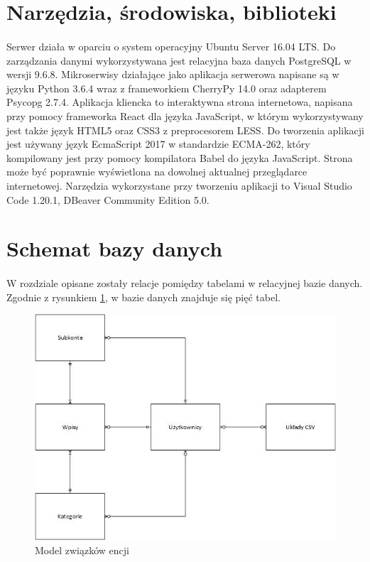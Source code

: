 \documentclass{article}
\begin{document}
	\section{Narzędzia, środowiska, biblioteki}
	\paragraph{}Serwer działa w oparciu o system operacyjny Ubuntu Server 16.04 LTS.
	Do zarządzania danymi wykorzystywana jest relacyjna baza danych PostgreSQL w wersji 9.6.8.
	Mikroserwisy działające jako aplikacja serwerowa napisane są w języku Python 3.6.4 wraz z frameworkiem CherryPy 14.0 oraz adapterem Psycopg 2.7.4.
	Aplikacja kliencka to interaktywna strona internetowa, napisana przy pomocy frameworka React dla języka JavaScript, w którym wykorzystywany jest także język HTML5 oraz CSS3 z preprocesorem LESS. Do tworzenia aplikacji jest używany język EcmaScript 2017 w standardzie ECMA-262, który kompilowany jest przy pomocy kompilatora Babel do języka JavaScript. Strona może być poprawnie wyświetlona na dowolnej aktualnej przeglądarce internetowej.
	Narzędzia wykorzystane przy tworzeniu aplikacji to Visual Studio Code 1.20.1, DBeaver Community Edition 5.0.
	\section{Schemat bazy danych}
	\paragraph{} W rozdziale opisane zostały relacje pomiędzy tabelami w relacyjnej bazie danych. Zgodnie z rysunkiem \ref{fig:er}, w bazie danych znajduje się pięć tabel.
	\begin{figure}[H]
		\centering
		\includegraphics[width=0.8\linewidth]{assets/er.jpg}
		\caption[]{Model związków encji}
		\label{fig:er}
	\end{figure}
	
\end{document}
